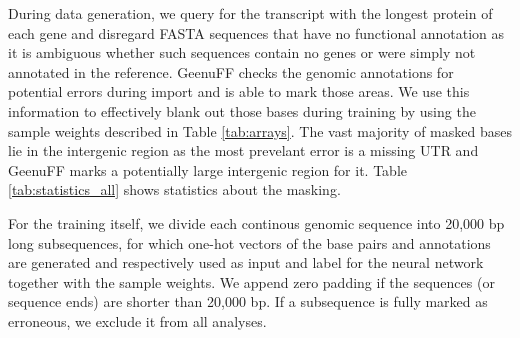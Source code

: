 \documentclass{bioinfo}
\begin{document}
\begin{methods}
\begin{table}[!htb]
\label{tab:arrays}
\end{table}

During data generation, we query for the transcript with the longest protein of each gene and 
disregard FASTA sequences that have no functional annotation as it is ambiguous
whether such sequences contain no genes or were simply not annotated in the reference. GeenuFF checks the 
genomic annotations for potential errors during import and is able to mark those 
areas. We use this information to effectively blank out those bases during training 
by using the sample weights described in Table \ref{tab:arrays}. The vast majority 
of masked bases lie in the intergenic region as the most prevelant error is a 
missing UTR and GeenuFF marks a potentially large intergenic region for it. Table 
\ref{tab:statistics_all} shows statistics about the masking. 

For the training itself, we divide each continous genomic sequence into 20,000 bp 
long subsequences, for which one-hot vectors of the base pairs and annotations 
are generated and respectively used as input and label for the neural network 
together with the sample weights. We append zero padding if the sequences (or
sequence ends) are shorter than 20,000 bp. 
If a subsequence is fully marked as erroneous, we exclude it from all analyses. 


\end{methods}
\end{document}
